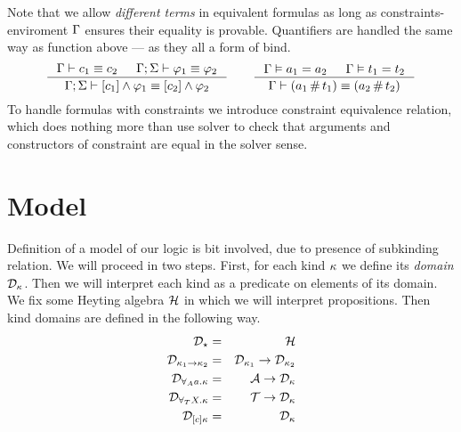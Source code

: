 \documentclass[english, mgr]{iithesis}
\begin{document}
Note that we allow \textit{different terms} in equivalent formulas as long as
constraints-enviroment $\Gamma$ ensures their equality is provable.
Quantifiers are handled the same way as function above --- as they all a form of bind.
\begin{eqnarray*}
  \inference{
    \jgmnt[\Gamma]{\constr_1 \equiv \constr_2 } &
    \jgmnt[\Gamma; \Sigma]{\formphi_1 \equiv \formphi_2 }
  }{
    \jgmnt[\Gamma; \Sigma]{\fCAnd{\constr_1}\formphi_1 \equiv \fCAnd{\constr_2}\formphi_2 }
  }
\qquad
  \inference{
    \cjgmnt[\Gamma]{\atomv_1 \ceq \atomv_2 } & \cjgmnt[\Gamma]{\term_1 \ceq \term_2 }
  }{
    \jgmnt[\Gamma]{(\atomv_1 \cfresh \term_1) \equiv (\atomv_2 \cfresh \term_2) }
  }
\end{eqnarray*}
To handle formulas with constraints we introduce constraint equivalence relation,
which does nothing more than use solver to check that arguments and constructors
of constraint are equal in the solver sense.
\chapter{Model}

Definition of a model of our logic is bit involved,
due to presence of subkinding relation.
We will proceed in two steps.
First, for each kind $\kappa$ we define its \emph{domain} $\mathcal{D}_{\kappa}$.
Then we will interpret each kind as a predicate on elements of its domain.
We fix some Heyting algebra $\mathcal{H}$
in which we will interpret propositions.
Then kind domains are defined in the following way.
\begin{eqnarray*}
\mathcal{D}_{\star}                     & = & \mathcal{H} \\
\mathcal{D}_{\kappa_1 \to \kappa_2}    & = & \mathcal{D}_{\kappa_1} \rightarrow \mathcal{D}_{\kappa_2} \\
\mathcal{D}_{\forall_A a .\kappa}  & = & \mathcal{A}          \rightarrow \mathcal{D}_{\kappa} \\
\mathcal{D}_{\forall_T X .\kappa}  & = & \mathcal{T}          \rightarrow \mathcal{D}_{\kappa} \\
\mathcal{D}_{[c]\kappa}      & = & \mathcal{D}_{\kappa}
\end{eqnarray*}
\end{document}
